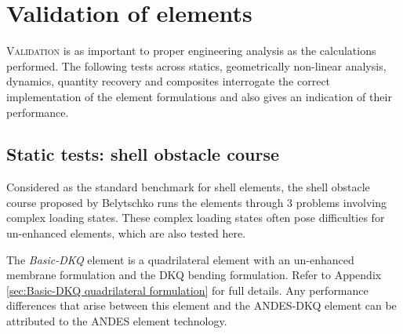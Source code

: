 



\chapter{Validation of elements}

\renewcommand{\Thema}{Validation of elements}

\lettrine[lines=2]{V}{alidation} is as important to proper engineering analysis as the calculations performed. The following tests across statics, geometrically non-linear analysis, dynamics, quantity recovery and composites interrogate the correct implementation of the element formulations and also gives an indication of their performance. 

\section{Static tests: shell obstacle course}
\label{section:shell obstacle course}

Considered as the standard benchmark for shell elements, the shell obstacle course proposed by Belytschko \cite{Bel85} runs the elements through 3 problems involving complex loading states. These complex loading states often pose difficulties for un-enhanced elements, which are also tested here.

The \textit{Basic-DKQ} element is a quadrilateral element with an un-enhanced membrane formulation and the DKQ bending formulation. Refer to Appendix \ref{sec:Basic-DKQ quadrilateral formulation} for full details. Any performance differences that arise between this element and the ANDES-DKQ element can be attributed to the ANDES element technology.

